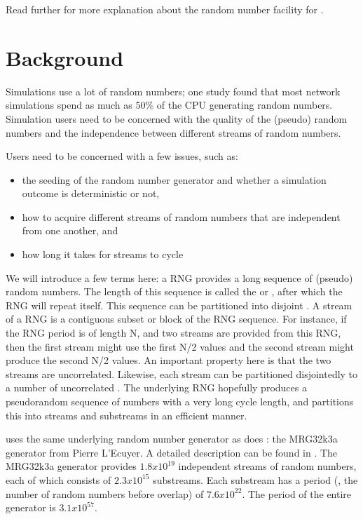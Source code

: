 \documentclass[letterpaper,10pt,english]{sphinxmanual}
\begin{document}
Read further for more explanation about the random number facility for .


\section{Background}
\label{\detokenize{random-variables:background}}
Simulations use a lot of random numbers; one study
found that most network simulations spend as much as 50\%
of the CPU generating random numbers.  Simulation users need
to be concerned with the quality of the (pseudo) random numbers and
the independence between different streams of random numbers.

Users need to be concerned with a few issues, such as:
\begin{itemize}
\item {} 
the seeding of the random number generator and whether a
simulation outcome is deterministic or not,

\item {} 
how to acquire different streams of random numbers that are
independent from one another, and

\item {} 
how long it takes for streams to cycle

\end{itemize}

We will introduce a few terms here:  a RNG provides a long sequence
of (pseudo) random numbers.
The length of this sequence is called the 
or , after which the RNG will repeat itself.
This sequence can
be  partitioned into disjoint .  A stream of a
RNG is a contiguous subset or block of the RNG sequence.
For instance, if the
RNG period is of length N, and two streams are provided from this
RNG, then
the first stream might use the first N/2 values and the second
stream might produce the second N/2 values.  An important property
here is that the two streams are uncorrelated.  Likewise, each
stream can be partitioned disjointedly to a number of
uncorrelated .  The underlying RNG hopefully
produces a pseudo\sphinxhyphen{}random sequence of numbers with a very long
cycle length, and partitions this into streams and substreams in an
efficient manner.

 uses the same underlying random number generator as does :  the
MRG32k3a generator from Pierre L’Ecuyer.  A detailed description can be found in
.  The MRG32k3a
generator provides \(1.8x10^{19}\) independent streams of random numbers,
each of which consists of \(2.3x10^{15}\) substreams. Each substream has a
period (, the number of random numbers before overlap) of
\(7.6x10^{22}\). The period of the entire generator is \(3.1x10^{57}\).
\end{document}
